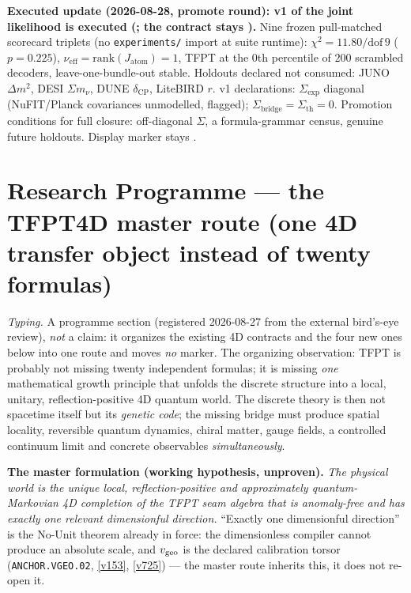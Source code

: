 \par\smallskip\noindent\textbf{Executed update (2026-08-28, promote round): v1 of the joint
likelihood is executed
(; the contract stays
\mO).}
Nine frozen pull-matched scorecard triplets (no \texttt{experiments/} import at suite runtime):
$\chi^2=11.80/\mathrm{dof}\,9$ ($p=0.225$), $\nu_{\mathrm{eff}}=\mathrm{rank}(J_{\mathrm{atom}})=1$,
TFPT at the $0$th percentile of $200$ scrambled decoders, leave-one-bundle-out stable.
Holdouts declared not consumed: JUNO $\Delta m^2$, DESI $\Sigma m_\nu$, DUNE $\delta_{\mathrm{CP}}$,
LiteBIRD $r$.  v1 declarations: $\Sigma_{\mathrm{exp}}$ diagonal (NuFIT/Planck covariances
unmodelled, flagged); $\Sigma_{\mathrm{bridge}}=\Sigma_{\mathrm{th}}=0$.  Promotion conditions
for full closure: off-diagonal $\Sigma$, a formula-grammar census, genuine future holdouts.
Display marker stays \mO.

\section*{Research Programme --- the TFPT4D master route (one 4D transfer object instead of twenty formulas)}
\noindent\emph{Typing.} A programme section (registered 2026-08-27 from the external bird's-eye
review), \emph{not} a claim: it organizes the existing 4D contracts and the four new ones below
into one route and moves \emph{no} marker.  The organizing observation: TFPT is probably not
missing twenty independent formulas; it is missing \emph{one} mathematical growth principle that
unfolds the discrete structure into a local, unitary, reflection-positive 4D quantum world.  The
discrete theory is then not spacetime itself but its \emph{genetic code}; the missing bridge
must produce spatial locality, reversible quantum dynamics, chiral matter, gauge fields, a
controlled continuum limit and concrete observables \emph{simultaneously}.

\par\smallskip\noindent\textbf{The master formulation (working hypothesis, unproven).}
\emph{The physical world is the unique local, reflection-positive and approximately
quantum-Markovian 4D completion of the TFPT seam algebra that is anomaly-free and has exactly
one relevant dimensionful direction.}  ``Exactly one dimensionful direction'' is the No-Unit
theorem already in force: the dimensionless compiler cannot produce an absolute scale, and
$v_{\rm geo}$ is the declared calibration torsor (\texttt{ANCHOR.VGEO.02}, \vref{v153},
\vref{v725}) --- the master route inherits this, it does not re-open it.

